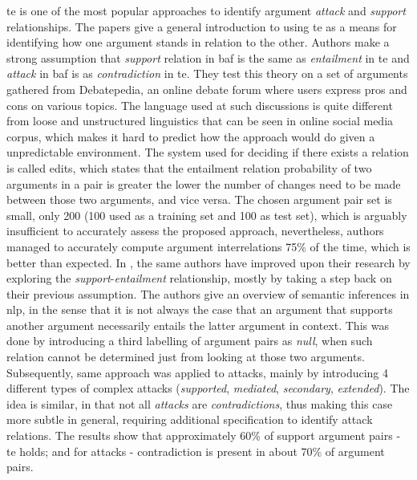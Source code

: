  \gls{te} is one of the most popular approaches to identify argument \textit{attack} and \textit{support} relationships. The \autocite{Cabrio2012NaturalLA, Cabrio2012CombiningTE} papers give a general introduction to using \gls{te} as a means for identifying how one argument stands in relation to the other. Authors make a strong assumption that \textit{support} relation in \gls{baf} is the same as \textit{entailment} in \gls{te} and \textit{attack} in \gls{baf} is as \textit{contradiction} in \gls{te}. They test this theory on a set of arguments gathered from Debatepedia, an online debate forum where users express pros and cons on various topics. The language used at such discussions is quite different from loose and unstructured linguistics that can be seen in online social media corpus, which makes it hard to predict how the approach would do given a unpredictable environment. The system used for deciding if there exists a relation is called \gls{edits}, which states that the entailment relation probability of two arguments in a pair is greater the lower the number of changes need to be made between those two arguments, and vice versa. The chosen argument pair set is small, only 200 (100 used as a training set and 100 as test set), which is arguably insufficient to accurately assess the proposed approach, nevertheless, authors managed to accurately compute argument interrelations 75\% of the time, which is better than expected. In \autocite{Cabrio2013ANL, Cabrio2013DetectingBS}, the same authors have improved upon their research by exploring the \textit{support}-\textit{entailment} relationship, mostly by taking a step back on their previous assumption. The authors give an overview of semantic inferences in \gls{nlp}, in the sense that it is not always the case that an argument that supports another argument necessarily entails the latter argument in context. This was done by introducing a third labelling of argument pairs as \textit{null}, when such relation cannot be determined just from looking at those two arguments. Subsequently, same approach was applied to attacks, mainly by introducing 4 different types of complex attacks (\textit{supported}, \textit{mediated}, \textit{secondary}, \textit{extended}). The idea is similar, in that not all \textit{attacks} are \textit{contradictions}, thus making this case more subtle in general, requiring additional specification to identify attack relations. The results show that approximately 60\% of support argument pairs - \gls{te} holds; and for attacks - contradiction is present in about 70\% of argument pairs.
 
